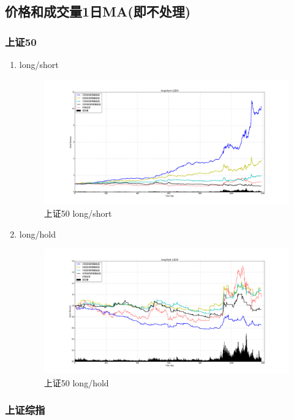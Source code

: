 \documentclass[12pt,a4paper]{article}
\begin{document}
\subsection{价格和成交量1日MA(即不处理)}

\subsubsection{上证50}

\begin{enumerate}
\item long/short 
\begin{figure}[H]
	\centering
	\includegraphics[width=1.0\textwidth]{img_r_1/sz50.png}
	\caption{上证50 long/short}
\end{figure}

\item long/hold 
\begin{figure}[H]
	\centering
	\includegraphics[width=1.0\textwidth]{img_r_1/sz50_1.png}
	\caption{上证50 long/hold}
\end{figure}
\end{enumerate}

\subsubsection{上证综指}
\end{document}
